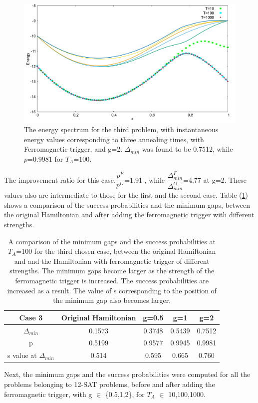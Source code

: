 \documentclass[12]{article}
\begin{document}
\begin{figure}[H]
\centering 
\includegraphics[scale=0.3]{528_s12_F_g2.png}
\caption{The energy spectrum for the third problem, with instantaneous energy values corresponding to three annealing times, with Ferromagnetic trigger, and g=2. $\Delta_{min}$ was found to be 0.7512, while $p$=0.9981 for $T_A$=100.}
\label{fig:f9}
\end{figure}
The improvement ratio for this case,$\dfrac{p^F}{p^O}$=1.91 , while $\dfrac{\Delta_{min}^F}{\Delta_{min}^O}$=4.77 at g=2. These values also are intermediate to those for the first and the second case.  Table (\ref{tab:f3}) shows a comparison of the success probabilities and the minimum gaps, between the original Hamiltonian and after adding the ferromagnetic trigger with different strengths.
\begin{table}
\centering
\renewcommand{\arraystretch}{1.8}
\begin{tabular}{|c|c|c|c|c|}
\hline 
Case 3 & Original Hamiltonian & g=0.5 & g=1 & g=2 \\ 
\hline 
$\Delta_{min}$ & 0.1573 & 0.3748 & 0.5439 & 0.7512 \\ 
\hline 
p & 0.5199 & 0.9577 & 0.9945 & 0.9981 \\ 
\hline 
s value at $\Delta_{min}$ & 0.514 & 0.595 & 0.665 & 0.760 \\
\hline

\end{tabular} 
\caption{A comparison of the minimum gaps and the success probabilities at $T_A$=100 for the third chosen case, between the original Hamiltonian and and the Hamiltonian with ferromagnetic trigger of different strengths. The minimum gaps become larger as the strength of the ferromagnetic trigger is increased. The success probabilities are increased as a result. The value of s corresponding to the position of the minimum gap also becomes larger.}
\label{tab:f3}
\end{table}
Next, the minimum gaps and the success probabilities were computed for all the problems belonging to 12-SAT problems, before and after adding the ferromagnetic trigger, with g $\in$ \{0.5,1,2\}, for $T_A$ $\in$ {10,100,1000}. \\
\end{document}
